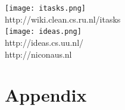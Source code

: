 \documentclass{beamer}
\begin{document}
\begin{frame}
\texttt{[image: itasks.png]}\\
http://wiki.clean.cs.ru.nl/itasks\\
\vspace{0.5cm}
\texttt{[image: ideas.png]}\\
http://ideas.cs.uu.nl/\\
\vspace{1cm}
http://niconaus.nl\\

\end{frame}


\section*{Appendix}
\appendix
\end{document}
